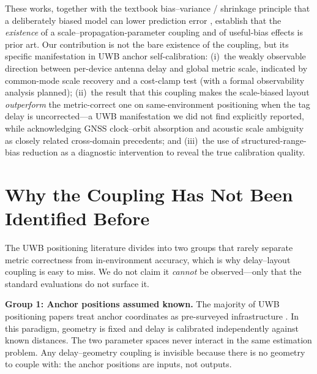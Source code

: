 \documentclass[11pt,a4paper]{article}
\begin{document}
These works, together with the textbook bias--variance / shrinkage principle that a
deliberately biased model can lower prediction error
\citep{hastie_2009_elements_statistical_learning}, establish that the \emph{existence}
of a scale--propagation-parameter coupling and of useful-bias effects is prior art.
Our contribution is not the bare existence of the coupling, but its specific
manifestation in UWB anchor self-calibration: (i)~the weakly observable direction
between per-device antenna delay and global metric scale, indicated by common-mode
scale recovery and a cost-clamp test (with a formal observability analysis planned);
(ii)~the result that this coupling makes the scale-biased layout
\emph{outperform} the metric-correct one on same-environment positioning when the tag
delay is uncorrected---a UWB manifestation we did not find explicitly reported, while
acknowledging GNSS clock--orbit absorption \citep{pan_2015_realtime_ppp_clock_orbit}
and acoustic scale ambiguity \citep{burgess_2015_toa_self_calibration} as closely
related cross-domain precedents; and (iii)~the use of structured-range-bias reduction
as a diagnostic intervention to reveal the true calibration quality.

\section{Why the Coupling Has Not Been Identified Before}

The UWB positioning literature divides into two groups that rarely separate metric
correctness from in-environment accuracy, which is why delay--layout coupling is easy
to miss. We do not claim it \emph{cannot} be observed---only that the standard
evaluations do not surface it.

\textbf{Group 1: Anchor positions assumed known.} The majority of UWB positioning
papers treat anchor coordinates as pre-surveyed infrastructure
\citep{prorok_2013_models_algorithms_uwb_localization_thesis,wymeersch_2012_a_machine_learning_approach,kong_2023_nlos_identification_for_uwb,sung_2023_accurate_indoor_positioning_for}.
In this paradigm, geometry is fixed and delay is calibrated independently against
known distances. The two parameter spaces never interact in the same estimation
problem. Any delay--geometry coupling is invisible because there is no geometry to
couple with: the anchor positions are inputs, not outputs.
\end{document}
